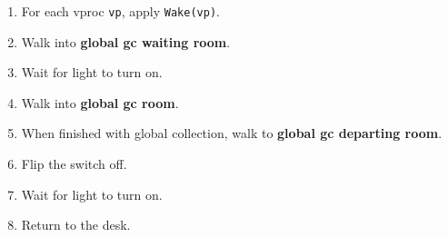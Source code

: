 \documentclass[11pt]{article}
\begin{document}
{\begin{enumerate}
  \item For each vproc \texttt{vp}, apply \texttt{Wake(vp)}.
  \item Walk into \textbf{global gc waiting room}.
  \item Wait for light to turn on.
  \item Walk into \textbf{global gc room}.
  \item When finished with global collection, walk to \textbf{global gc departing room}.
  \item Flip the switch off.
  \item Wait for light to turn on.
  \item Return to the desk.
\end{enumerate}
}
\end{document}
